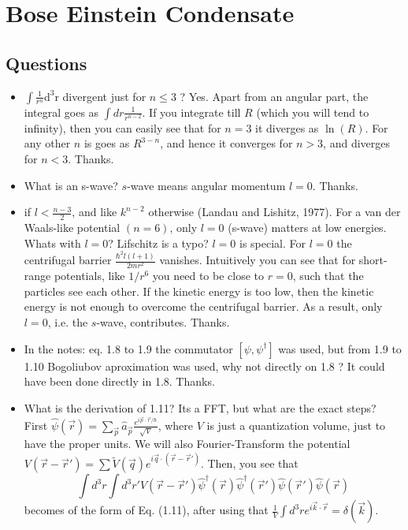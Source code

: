 \section{Bose Einstein Condensate}

\subsection{Questions}
\begin{itemize}
         \item $\int \frac{1}{r^{n}} \mathrm{d^{3}r}$ divergent just for $n \leq 3 $ ?
        {\color{red} Yes. Apart from an angular part, the integral goes as $\int dr \frac{1}{r^{n-2}}$. If you integrate  till $R$ (which you will tend to infinity), then you can easily see that for $n=3$ it diverges as  
        $\ln(R)$. For any other $n$ is goes as $R^{3-n}$, and hence it converges for $n>3$, and diverges for $n<3$. }
        {\color{green} Thanks.}
        
        \item What is an s-wave? {\color{red} $s$-wave means angular momentum $l=0$}.
        {\color{green} Thanks.}

        \item if $l < \frac{n-3}{2}$, and like $k^{n-2}$ otherwise (Landau and Lishitz, 1977). For a van der
        Waals-like potential $(n = 6)$, only $l = 0$ (s-wave) matters at low energies. Whats with $l=0$? Lifschitz is a typo?
        {\color{red}  $l=0$ is special. For $l=0$ the centrifugal barrier $\frac{\hbar^2l(l+1)}{2mr^2}$ vanishes. Intuitively you can see that for short-range potentials, like $1/r^6$ you need to
        be close to $r=0$, such that the particles see each other. If the kinetic energy is too low, then the kinetic energy is not enough to overcome the centrifugal barrier. As a result, only $l=0$, i.e. the $s$-wave, 
        contributes.}        
        {\color{green} Thanks.}

        \item In the notes: eq. 1.8 to 1.9 the commutator $[\psi, \psi^{\dagger}]$ was used, but from 1.9 to 1.10 Bogoliubov aproximation was used, why not directly on 1.8 ?
        {\color{red}  It could have been done directly in 1.8.}
        {\color{green} Thanks.}

        \item What is the derivation of 1.11? Its a FFT, but what are the exact steps?
        {\color{red}  First $\hat\psi(\vec r)=\sum_{\vec p} \hat a_{\vec p}\frac{e^{i\vec p\cdot\vec r/\hbar}}{\sqrt{V}}$, where $V$ is just a quantization volume, just to have the proper units.
        We will also Fourier-Transform the potential $V(\vec r-\vec r')=\sum \tilde V(\vec q)e^{i\vec q\cdot (\vec r-\vec r')}$. Then, you see that 
        $$
        \int d^3r \int d^3r' V(\vec r-\vec r') \hat\psi^\dag(\vec r) \hat\psi^\dag(\vec r')\hat\psi(\vec r')\hat\psi(\vec r)
        $$
        becomes of the form of Eq. (1.11), after using that $\frac{1}{V} \int d^3 r e^{i\vec k\cdot \vec r}=\delta(\vec k)$.}


\end{itemize}
